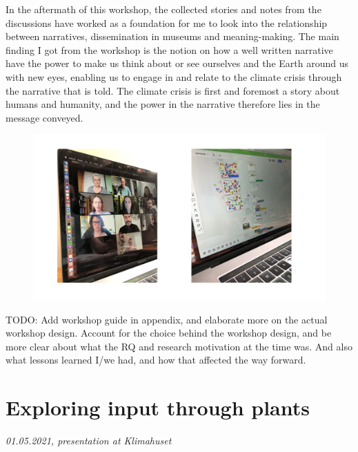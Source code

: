 In the aftermath of this workshop, the collected stories and notes from the discussions have worked as a foundation for me to look into the relationship between narratives, dissemination in museums and meaning-making. The main finding I got from the workshop is the notion on how a well written narrative have the power to make us think about or see ourselves and the Earth around us with new eyes, enabling us to engage in and relate to the climate crisis through the narrative that is told. The climate crisis is first and foremost a story about humans and humanity, and the power in the narrative therefore lies in the message conveyed. 

\begin{figure}[h]
\includegraphics[width=13cm]{pictures/narrative_workshop.png}
\centering 
\end{figure}


TODO: Add workshop guide in appendix, and elaborate more on the actual workshop design. Account for the choice behind the workshop design, and be more clear about what the RQ and research motivation at the time was. And also what lessons learned I/we had, and how that affected the way forward.


\section{Exploring input through plants}
\par
\emph{01.05.2021, presentation at Klimahuset}
\par

